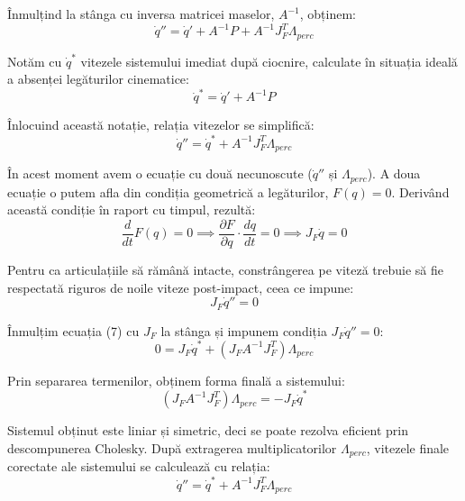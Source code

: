 \documentclass[12pt, a4paper]{article}
\begin{document}
Înmulțind la stânga cu inversa matricei maselor, $A^{-1}$, obținem:
\begin{equation}
    \dot{q}'' = \dot{q}' + A^{-1}P + A^{-1}J_F^T \Lambda_{perc}
\end{equation}

Notăm cu $\dot{q}^*$ vitezele sistemului imediat după ciocnire, calculate în situația ideală a absenței legăturilor cinematice:
\begin{equation}
    \dot{q}^* = \dot{q}' + A^{-1}P
\end{equation}

Înlocuind această notație, relația vitezelor se simplifică:
\begin{equation}
    \dot{q}'' = \dot{q}^* + A^{-1}J_F^T \Lambda_{perc}
\end{equation}

În acest moment avem o ecuație cu două necunoscute ($\dot{q}''$ și $\Lambda_{perc}$). A doua ecuație o putem afla din condiția geometrică a legăturilor, $F(q) = 0$. Derivând această condiție în raport cu timpul, rezultă:
\begin{equation}
    \frac{d}{dt}F(q) = 0 \implies \frac{\partial F}{\partial q} \cdot \frac{dq}{dt} = 0 \implies J_F \dot{q} = 0
\end{equation}

Pentru ca articulațiile să rămână intacte, constrângerea pe viteză trebuie să fie respectată riguros de noile viteze post-impact, ceea ce impune:
\begin{equation}
    J_F \dot{q}'' = 0
\end{equation}

Înmulțim ecuația (7) cu $J_F$ la stânga și impunem condiția $J_F \dot{q}'' = 0$:
\begin{equation}
    0 = J_F \dot{q}^* + (J_F A^{-1} J_F^T) \Lambda_{perc}
\end{equation}

Prin separarea termenilor, obținem forma finală a sistemului:
\begin{equation}
    (J_F A^{-1} J_F^T) \Lambda_{perc} = -J_F \dot{q}^*
\end{equation}

Sistemul obținut este liniar și simetric, deci se poate rezolva eficient prin descompunerea Cholesky. După extragerea multiplicatorilor $\Lambda_{perc}$, vitezele finale corectate ale sistemului se calculează cu relația:
\begin{equation}
    \dot{q}'' = \dot{q}^* + A^{-1}J_F^T \Lambda_{perc}
\end{equation}
\end{document}
